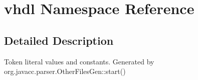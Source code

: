 \hypertarget{namespacevhdl}{}\section{vhdl Namespace Reference}
\label{namespacevhdl}


\subsection{Detailed Description}
Token literal values and constants. Generated by org.\+javacc.\+parser.\+Other\+Files\+Gen\+::start() 